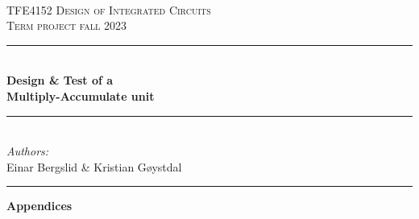 \documentclass{article}
\newcommand{\HRule}{\rule{\linewidth}{0.5mm}}
\begin{document}
\begin{titlepage}
\vbox{ }
\vbox{ }
\begin{center}
\\[1cm]
\textsc{\LARGE TFE4152 Design of Integrated Circuits}\\[1cm]
\textsc{\Large Term project fall 2023}\\[0.5cm]
\vbox{ }


\HRule \\[0.4cm]
{ \huge \bfseries Design \& Test of a \\Multiply-Accumulate unit}\\[0.4cm] %
\HRule \\[1.5cm]

\large
\emph{Authors:}\\
Einar Bergslid \& Kristian Gøystdal %
\vfill

\end{center}
\end{titlepage}

\newpage
\setlength{\parskip}{0ex}
\renewcommand{\baselinestretch}{0.1}\normalsize
\tableofcontents
\renewcommand{\baselinestretch}{1.00}\normalsize
\setlength{\parskip}{2ex}
\rule{\textwidth}{1pt}
\newpage








\newpage
{}



\newpage
\vspace*{7 cm}
\begin{center}
\textbf{\Huge Appendices}
\end{center}

\end{document}
